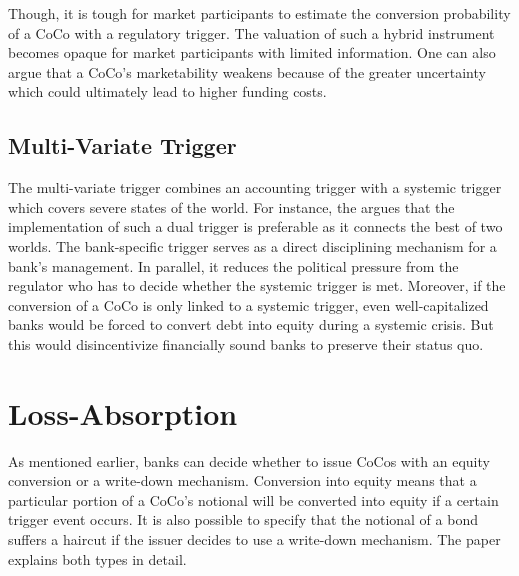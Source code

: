 Though, it is tough for market participants to estimate the conversion probability of a CoCo with a regulatory trigger. The valuation of such a hybrid instrument becomes opaque for market participants with limited information. \citep{alvemar2012modelling} One can also argue that a CoCo's marketability weakens because of the greater uncertainty which could ultimately lead to higher funding costs. \citep{de2014handbook} 

\subsection{Multi-Variate Trigger} \label{multivariatetrigger}

The multi-variate trigger combines an accounting trigger with a systemic trigger which covers severe states of the world. For instance, the \citet{squam2009expedited} argues that the implementation of such a dual trigger is preferable as it connects the best of two worlds. The bank-specific trigger serves as a direct disciplining mechanism for a bank's management. In parallel, it reduces the political pressure from the regulator who has to decide whether the systemic trigger is met. Moreover, if the conversion of a CoCo is only linked to a systemic trigger, even well-capitalized banks would be forced to convert debt into equity during a systemic crisis. But this would disincentivize financially sound banks to preserve their status quo.


\section{Loss-Absorption} \label{lossabsorption}

As mentioned earlier, banks can decide whether to issue CoCos with an equity conversion or a write-down mechanism. Conversion into equity means that a particular portion of a CoCo's notional will be converted into equity if a certain trigger event occurs. It is also possible to specify that the notional of a bond suffers a haircut if the issuer decides to use a write-down mechanism. The paper explains both types in detail.

